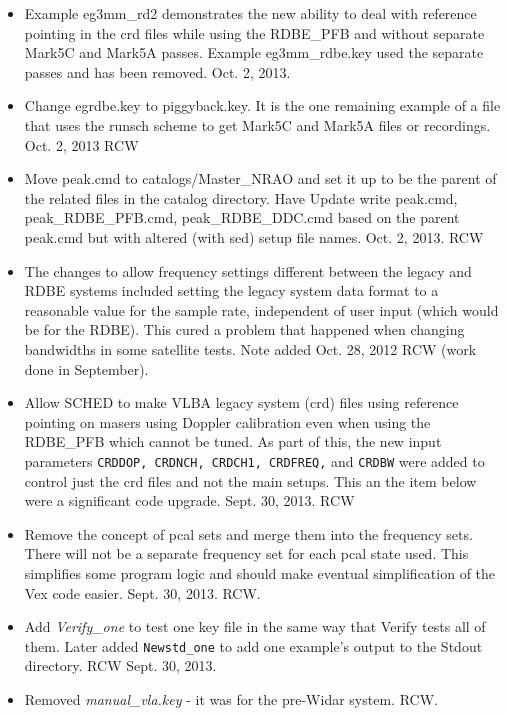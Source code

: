 \documentclass{report}
\begin{document}
\begin{itemize}
\item Example eg3mm\_rd2 demonstrates the new ability to deal with
reference pointing in the crd files while using the RDBE\_PFB and
without separate Mark5C and Mark5A passes.  Example eg3mm\_rdbe.key
used the separate passes and has been removed.  Oct. 2, 2013.

\item Change egrdbe.key to piggyback.key.  It is the one remaining
example of a file that uses the runsch scheme to get Mark5C and Mark5A
files or recordings.  Oct. 2, 2013  RCW

\item Move peak.cmd to catalogs/Master\_NRAO and set it up to be the
parent of the related files in the catalog directory.  Have Update
write peak.cmd, peak\_RDBE\_PFB.cmd, peak\_RDBE\_DDC.cmd based on the
parent peak.cmd but with altered (with sed) setup file names.  Oct. 2,
2013.  RCW

\item The changes to allow frequency settings different between the
legacy and RDBE systems included setting the legacy system data format
to a reasonable value for the sample rate, independent of user input 
(which would be for the RDBE).  This cured a problem that happened when 
changing bandwidths in some satellite tests.  Note added Oct. 28, 2012
RCW (work done in September).

\item Allow SCHED to make VLBA legacy system (crd) files using
reference pointing on masers using Doppler calibration even when using
the RDBE\_PFB which cannot be tuned.  As part of this, the new input
parameters {\tt CRDDOP, CRDNCH, CRDCH1, CRDFREQ,} and {\tt CRDBW} were
added to control just the crd files and not the main setups.  This an
the item below were a significant code upgrade.  Sept. 30, 2013.  RCW

\item Remove the concept of pcal sets and merge them into the frequency
sets.  There will not be a separate frequency set for each pcal state
used.  This simplifies some program logic and should make eventual
simplification of the Vex code easier.  Sept. 30, 2013.  RCW.

\item Add {\sl Verify\_one} to test one key file in the same way that
Verify tests all of them.  Later added {\tt Newstd\_one} to add one
example's output to the Stdout directory.  RCW Sept. 30, 2013.

\item Removed {\sl manual\_vla.key} - it was for the pre-Widar system.
RCW.


\end{itemize}
\end{document}
